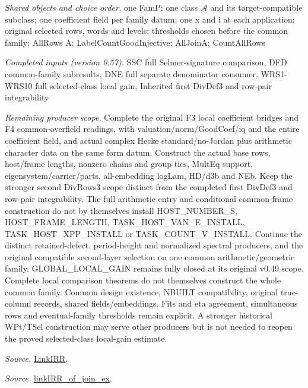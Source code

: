 \documentclass[11pt,a4paper]{article}
\numberwithin{equation}{section}
\theoremstyle{remark}\newtheorem{remark}[theorem]{Remark}
\begin{document}
\emph{Shared objects and choice order.} one FamP; one class $\mathcal A$ and its target-compatible subclass; one coefficient field per family datum; one x and i at each application; original selected rows, words and levels; thresholds chosen before the common family; AllRows A; LabelCountGoodInjective; AllJoinA; CountAllRows

\emph{Completed inputs (version 0.57).} SSC full Selmer-signature comparison, DFD common-family subresults, DNE full separate denominator consumer, WRS1-WRS10 full selected-class local gain, Inherited first DivDef3 and row-pair integrability

\emph{Remaining producer scope.} Complete the original F3 local coefficient bridges and F4 common-overfield readings, with valuation/norm/GoodCoef/iq and the entire coefficient field, and actual complex Hecke standard/no-Jordan plus arithmetic character data on the same form datum. Construct the actual base rows, host/frame lengths, nonzero chains and group ties, MultEq support, eigensystem/carrier/parts, all-embedding logLam, HD/d3b and NEb. Keep the stronger second DivRows3 scope distinct from the completed first DivDef3 and row-pair integrability. The full arithmetic entry and conditional common-frame construction do not by themselves install HOST\_\allowbreak NUMBER\_\allowbreak S, HOST\_\allowbreak FRAME\_\allowbreak LENGTH, TASK\_\allowbreak HOST\_\allowbreak VAN\_\allowbreak E\_\allowbreak INSTALL, TASK\_\allowbreak HOST\_\allowbreak XPP\_\allowbreak INSTALL or TASK\_\allowbreak COUNT\_\allowbreak V\_\allowbreak INSTALL. Continue the distinct retained-defect, period-height and normalized spectral producers, and the original compatible second-layer selection on one common arithmetic/geometric family. GLOBAL\_\allowbreak LOCAL\_\allowbreak GAIN remains fully closed at its original v0.49 scope. Complete local comparison theorems do not themselves construct the whole common family. Common design existence, NBUILT compatibility, original true-column records, shared fields/embeddings, Fits and eta agreement, simultaneous rows and eventual-family thresholds remain explicit. A stronger historical WPt/TSel construction may serve other producers but is not needed to reopen the proved selected-class local-gain estimate.

\emph{Source.} \href{https://github.com/CocoSgt/riemann-hypothesis-lean/blob/7cbf7a0c32fca1badf05931879a37c3f8a2b03b4/src/Formalism/SharpRestriction/GlobalTheoremInputs.lean#L55-L58}{LinkIRR}.

\emph{Source.} \href{https://github.com/CocoSgt/riemann-hypothesis-lean/blob/7cbf7a0c32fca1badf05931879a37c3f8a2b03b4/src/Development/AbelianVarietyTheory/Proofs/GlobalInterpolation/LinkIRROfJoinEx.lean#L17-L38}{linkIRR\_\allowbreak of\_\allowbreak join\_\allowbreak ex}.
\end{document}
